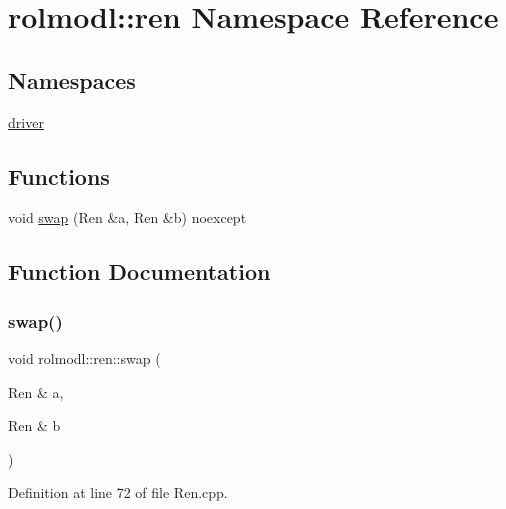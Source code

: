 \hypertarget{namespacerolmodl_1_1ren}{}\section{rolmodl\+::ren Namespace Reference}
\label{namespacerolmodl_1_1ren}
\subsection*{Namespaces}
\begin{DoxyCompactItemize}
\item 
 \mbox{\hyperlink{namespacerolmodl_1_1ren_1_1driver}{driver}}
\end{DoxyCompactItemize}
\subsection*{Functions}
\begin{DoxyCompactItemize}
\item 
void \mbox{\hyperlink{namespacerolmodl_1_1ren_a7cd4e81efe8732eaf414cbd4aa44e4d4}{swap}} (Ren \&a, Ren \&b) noexcept
\end{DoxyCompactItemize}


\subsection{Function Documentation}
\mbox{\label{namespacerolmodl_1_1ren_a7cd4e81efe8732eaf414cbd4aa44e4d4}} 
\subsubsection{\texorpdfstring{swap()}{swap()}}
{\footnotesize\ttfamily void rolmodl\+::ren\+::swap (\begin{DoxyParamCaption}\item[{Ren \&}]{a,  }\item[{Ren \&}]{b }\end{DoxyParamCaption})\hspace{0.3cm}{\ttfamily [noexcept]}}



Definition at line 72 of file Ren.\+cpp.


